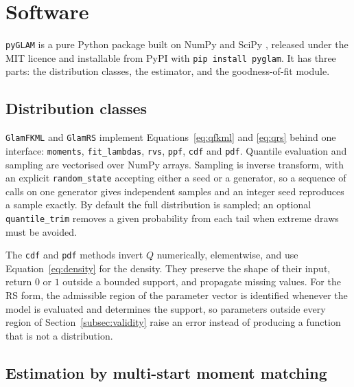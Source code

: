 \section{Software}\label{sec:software}

\texttt{pyGLAM} is a pure Python package built on NumPy
\parencite{HarrisEtAl2020} and SciPy \parencite{VirtanenEtAl2020}, released
under the MIT licence and installable from PyPI with \texttt{pip install
pyglam}. It has three parts: the distribution classes, the estimator, and the
goodness-of-fit module.

\subsection{Distribution classes}

\texttt{GlamFKML} and \texttt{GlamRS} implement Equations~\eqref{eq:qfkml} and
\eqref{eq:qrs} behind one interface: \texttt{moments}, \texttt{fit\_lambdas},
\texttt{rvs}, \texttt{ppf}, \texttt{cdf} and \texttt{pdf}. Quantile evaluation and
sampling are vectorised over NumPy arrays. Sampling is inverse transform, with an
explicit \texttt{random\_state} accepting either a seed or a generator, so a
sequence of calls on one generator gives independent samples and an integer seed
reproduces a sample exactly. By default the full distribution is sampled; an
optional \texttt{quantile\_trim} removes a given probability from each tail when
extreme draws must be avoided.

The \texttt{cdf} and \texttt{pdf} methods invert $Q$ numerically, elementwise,
and use Equation~\eqref{eq:density} for the density. They preserve the shape of
their input, return $0$ or $1$ outside a bounded support, and propagate missing
values. For the RS form, the admissible region of the parameter vector is
identified whenever the model is evaluated and determines the support, so parameters outside
every region of Section~\ref{subsec:validity} raise an error instead of
producing a function that is not a distribution.

\subsection{Estimation by multi-start moment matching}

